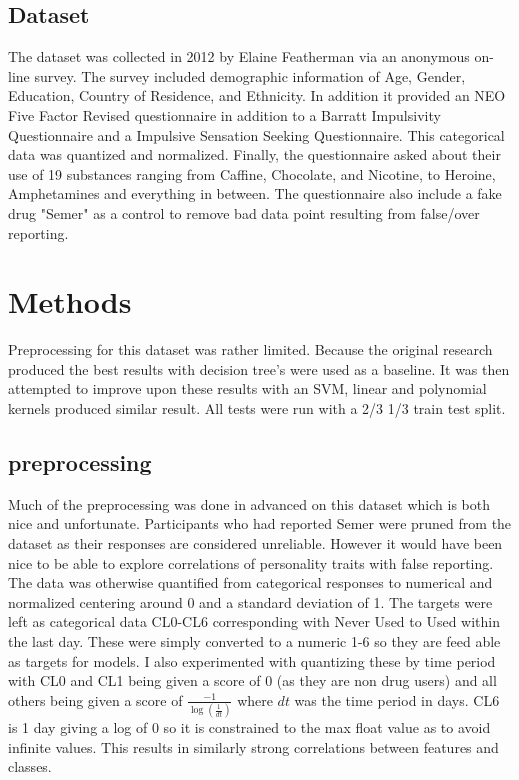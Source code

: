 \documentclass[12pt]{article}
\begin{document}
\begin{flushleft}
		\subsection{Dataset}
		The dataset was collected in 2012 by Elaine Featherman via an anonymous on-line survey. The survey included demographic information of Age, Gender, Education, Country of Residence, and Ethnicity. In addition it provided an NEO Five Factor Revised questionnaire in addition to a Barratt Impulsivity Questionnaire and a Impulsive Sensation Seeking Questionnaire. This categorical data was quantized and normalized. Finally, the questionnaire asked about their use of 19 substances ranging from Caffine, Chocolate, and Nicotine, to Heroine, Amphetamines and everything in between. The questionnaire also include a fake drug "Semer" as a control to remove bad data point resulting from false/over reporting.~\cite{Fehrman2017}\\
		
		\section{Methods}
		Preprocessing for this dataset was rather limited. Because the original research produced the best results with decision tree's were used as a baseline. It was then attempted to improve upon these results with an SVM, linear and polynomial kernels produced similar result. All tests were run with a 2/3 1/3 train test split.\\
		
		\subsection{preprocessing}
		Much of the preprocessing was done in advanced on this dataset which is both nice and unfortunate. Participants who had reported Semer were pruned from the dataset as their responses are considered unreliable. However it would have been nice to be able to explore correlations of personality traits with false reporting. The data was otherwise quantified from categorical responses to numerical and normalized centering around 0 and a standard deviation of 1. The targets were left as categorical data CL0-CL6 corresponding with Never Used to Used within the last day. These were simply converted to a numeric 1-6 so they are feed able as targets for models. I also experimented with quantizing these by time period with CL0 and CL1 being given a score of 0 (as they are non drug users) and all others being given a score of $\frac{-1}{\log(\frac{1}{dt})}$ where $dt$ was the time period in days. CL6 is 1 day giving a log of 0 so it is constrained to the max float value as to avoid infinite values. This results in similarly strong correlations between features and classes.\\
		

\end{flushleft}
\end{document}
